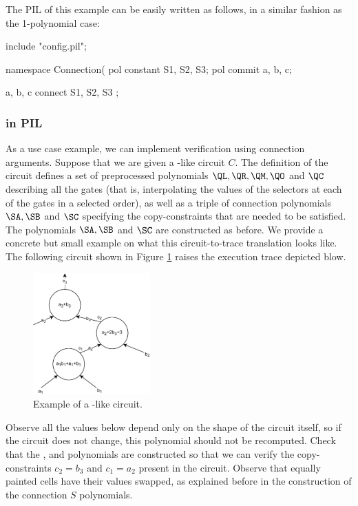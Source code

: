 The PIL of this example can be easily written as follows, in a similar fashion as the 1-polynomial case:
\begin{pil}
include "config.pil";

namespace Connection(%
    pol constant S1, S2, S3;
    pol commit a, b, c;

    { a, b, c } connect { S1, S2, S3 };
\end{pil}


\subsubsection{\plonk in PIL}

As a use case example, we can implement \plonk verification using connection arguments. Suppose that we are given a \plonk-like circuit $C$. The definition of the circuit defines a set of preprocessed polynomials $\QL, \QR, \QM, \QO$ and $\QC$ describing all the \plonk gates (that is, interpolating the values of the \plonk selectors at each of the gates in a selected order), as well as a triple of connection polynomials $\SA, \SB$ and $\SC$ specifying the copy-constraints that are needed to be satisfied. The polynomials $\SA, \SB$ and $\SC$ are constructed as before. We provide a concrete but small example on what this circuit-to-trace translation looks like. The following \plonk circuit shown in Figure \ref{figure:plonk-circuit-example} raises the execution trace depicted blow.

\begin{figure}[H]
\centering
\includegraphics[width=0.4\textwidth]{../figures/plonk-circuit.drawio}
\caption{Example of a \plonk-like circuit.}
\label{figure:plonk-circuit-example}
\end{figure}

Observe all the values below depend only on the shape of the circuit itself, so if the circuit does not change, this polynomial should not be recomputed. Check that the \SA, \SB and \SC polynomials are constructed so that we can verify the copy-constraints $c_2 = b_3$ and $c_1 = a_2$ present in the circuit. Observe that equally painted cells have their values swapped, as explained before in the construction of the connection $S$ polynomials.  

